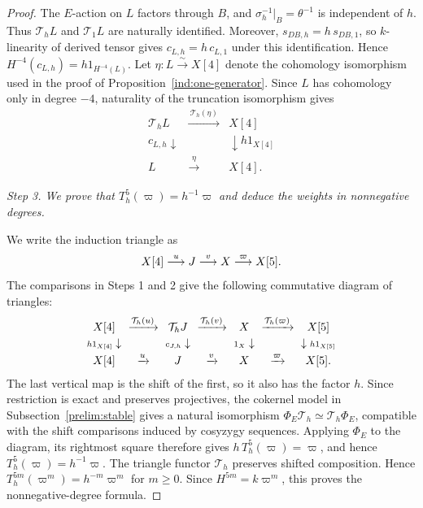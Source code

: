 \documentclass[11pt]{article}
\begin{document}
\begin{proof}
The $E$-action on $L$ factors through $B$, and
$\sigma_h^{-1}|_B=\theta^{-1}$ is independent of $h$.
Thus $\mathcal T_hL$ and $\mathcal T_1L$ are naturally identified.
Moreover, $s_{DB,h}=h\,s_{DB,1}$, so $k$-linearity of derived
tensor gives $c_{L,h}=h\,c_{L,1}$ under this identification.
Hence $H^{-4}(c_{L,h})=h1_{H^{-4}(L)}$.
Let $\eta:L\xrightarrow{\sim}X[4]$ denote the cohomology isomorphism
used in the proof of Proposition~\ref{ind:one-generator}. Since $L$ has cohomology only
in degree $-4$, naturality of the truncation isomorphism gives
\[
 \begin{array}{ccc}
 \mathcal T_hL&\xrightarrow{\ \mathcal T_h(\eta)\ }&X[4]\\[2pt]
 {\scriptstyle c_{L,h}}\downarrow
 &&\downarrow{\scriptstyle h1_{X[4]}}\\[2pt]
 L&\xrightarrow{\ \eta\ }&X[4].
 \end{array}
\]

\smallskip
\noindent\emph{Step 3. We prove that $T_h^5(\varpi)=h^{-1}\varpi$ and deduce the weights in nonnegative degrees.}
\par\nobreak\smallskip\nobreak
\noindent
We write the induction triangle as
$$X[4]\stackrel{u}{\longrightarrow}J\stackrel{v}{\longrightarrow}X\stackrel{\varpi}{\longrightarrow}X[5].$$
The comparisons in Steps 1 and 2 give the following commutative
diagram of triangles:
\[
 \begingroup\setlength{\arraycolsep}{3pt}
 \begin{array}{ccccccc}
 X[4]&\xrightarrow{\mathcal T_h(u)}&\mathcal T_hJ
 &\xrightarrow{\mathcal T_h(v)}&X
 &\xrightarrow{\mathcal T_h(\varpi)}&X[5]\\[2pt]
 {\scriptstyle h 1_{X[4]}}\downarrow
 &&{\scriptstyle c_{J,h}}\downarrow
 &&{\scriptstyle1_X}\downarrow
 &&\downarrow{\scriptstyle h 1_{X[5]}}\\[2pt]
 X[4]&\xrightarrow{u}&J&\xrightarrow{v}&X
 &\xrightarrow{\varpi}&X[5].
 \end{array}
 \endgroup
\]
The last vertical map is the shift of the first, so it also has
the factor $h$. Since restriction is exact and preserves projectives,
the cokernel model in Subsection~\ref{prelim:stable} gives a natural
isomorphism $\Phi_E\mathcal T_h\simeq\mathcal T_h\Phi_E$, compatible
with the shift comparisons induced by cosyzygy sequences.
Applying $\Phi_E$ to the diagram, its rightmost square therefore gives
$h\,T_h^5(\varpi)=\varpi$, and hence $T_h^5(\varpi)=h^{-1}\varpi$.
The triangle functor $\mathcal T_h$ preserves shifted composition. Hence
$T_h^{5m}(\varpi^m)=h^{-m}\varpi^m$ for $m\ge0$.
Since $H^{5m}=k\varpi^m$, this proves the nonnegative-degree formula.


\end{proof}
\end{document}

